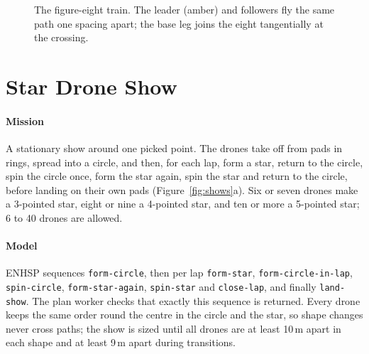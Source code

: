 \documentclass[11pt,a4paper,oneside]{report}
\newcommand{\code}[1]{\texttt{#1}}
\begin{document}
\begin{figure}[H]
\centering
{}
\caption{The figure-eight train. The leader (amber) and followers fly the same path one spacing
apart; the base leg joins the eight tangentially at the crossing.}
\label{fig:fig8}
\end{figure}

\section{Star Drone Show}
\paragraph{Mission}
A stationary show around one picked point. The drones take off from pads in rings, spread into a
circle, and then, for each lap, form a star, return to the circle, spin the circle once, form the
star again, spin the star and return to the circle, before landing on their own pads
(Figure~\ref{fig:shows}a). Six or seven drones make a 3-pointed star, eight or nine a 4-pointed
star, and ten or more a 5-pointed star; 6 to 40 drones are allowed.

\paragraph{Model}
ENHSP sequences \code{form-circle}, then per lap \code{form-star}, \code{form-circle-in-lap},
\code{spin-circle}, \code{form-star-again}, \code{spin-star} and \code{close-lap}, and finally
\code{land-show}. The plan worker checks that exactly this sequence is returned. Every drone keeps
the same order round the centre in the circle and the star, so shape changes never cross paths;
the show is sized until all drones are at least 10\,m apart in each shape and at least 9\,m apart
during transitions.
\end{document}
